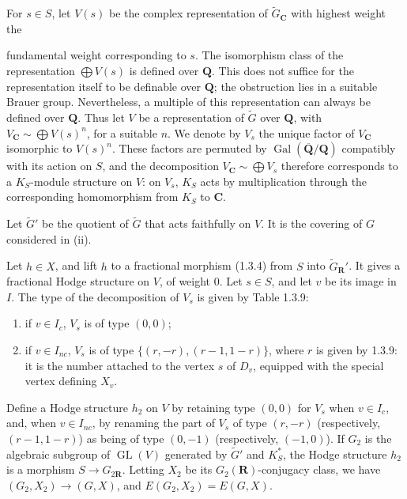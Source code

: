 \documentclass[10pt,a4paper]{article}
\newcommand{\SourcePage}[2]{\clearpage\setcounter{page}{#2}\typeout{D031_SOURCE_PAGE physical=#1 printed=#2}}
\begin{document}
For \(s\in S\), let \(V(s)\) be the complex representation of \(\widetilde G_{\mathbf C}\) with highest weight the

\SourcePage{27}{273}
fundamental weight corresponding to \(s\). The isomorphism class of the representation \(\bigoplus V(s)\) is defined over \(\mathbf Q\). This does not suffice for the representation itself to be definable over \(\mathbf Q\); the obstruction lies in a suitable Brauer group. Nevertheless, a multiple of this representation can always be defined over \(\mathbf Q\). Thus let \(V\) be a representation of \(\widetilde G\) over \(\mathbf Q\), with \(V_{\mathbf C}\sim\bigoplus V(s)^n\), for a suitable \(n\). We denote by \(V_s\) the unique factor of \(V_{\mathbf C}\) isomorphic to \(V(s)^n\). These factors are permuted by \(\operatorname{Gal}(\overline{\mathbf Q}/\mathbf Q)\) compatibly with its action on \(S\), and the decomposition \(V_{\mathbf C}\sim\bigoplus V_s\) therefore corresponds to a \(K_S\)-module structure on \(V\): on \(V_s\), \(K_S\) acts by multiplication through the corresponding homomorphism from \(K_S\) to \(\mathbf C\).

Let \(\widetilde G'\) be the quotient of \(\widetilde G\) that acts faithfully on \(V\). It is the covering of \(G\) considered in (ii).

Let \(h\in X\), and lift \(h\) to a fractional morphism (1.3.4) from \(S\) into \(\widetilde G_{\mathbf R}'\). It gives a fractional Hodge structure on \(V\), of weight 0. Let \(s\in S\), and let \(v\) be its image in \(I\). The type of the decomposition of \(V_s\) is given by Table 1.3.9:

\begin{enumerate}
\def\labelenumi{(\alph{enumi})}
\item
  if \(v\in I_c\), \(V_s\) is of type \((0,0)\);
\item
  if \(v\in I_{nc}\), \(V_s\) is of type \(\{(r,-r),(r-1,1-r)\}\), where \(r\) is given by 1.3.9: it is the number attached to the vertex \(s\) of \(D_v\), equipped with the special vertex defining \(X_v\).
\end{enumerate}

Define a Hodge structure \(h_2\) on \(V\) by retaining type \((0,0)\) for \(V_s\) when \(v\in I_c\), and, when \(v\in I_{nc}\), by renaming the part of \(V_s\) of type \((r,-r)\) (respectively, \((r-1,1-r)\)) as being of type \((0,-1)\) (respectively, \((-1,0)\)). If \(G_2\) is the algebraic subgroup of \(\operatorname{GL}(V)\) generated by \(\widetilde G'\) and \(K_S^*\), the Hodge structure \(h_2\) is a morphism \(S\to G_{2\mathbf R}\). Letting \(X_2\) be its \(G_2(\mathbf R)\)-conjugacy class, we have \((G_2,X_2)\to(G,X)\), and \(E(G_2,X_2)=E(G,X)\).
\end{document}
